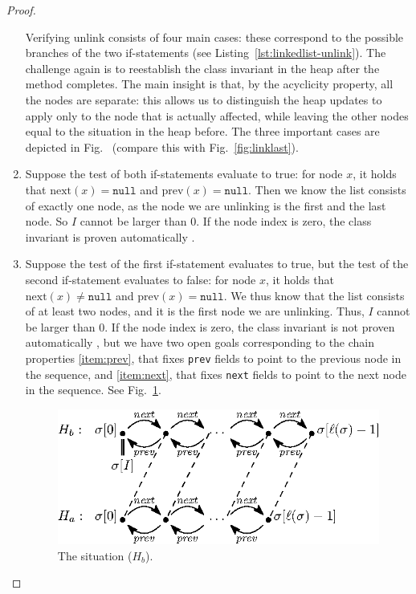 \documentclass[runningheads]{llncs}
\begin{document}
\begin{proof}
\begin{enumerate}
    Verifying unlink consists of four main cases: these correspond to the possible branches of the two if-statements (see Listing~\ref{lst:linkedlist-unlink}). The challenge again is to reestablish the class invariant in the heap after the method completes. The main insight is that, by the acyclicity property, all the nodes are separate: this allows us to distinguish the heap updates to apply only to the node that is actually affected, while leaving the other nodes equal to the situation in the heap before. The three important cases are depicted in Fig.~ (compare this with Fig.~\ref{fig:linklast}).

    \item Suppose the test of both if-statements evaluate to true: for node $x$, it holds that $\mathrm{next}(x)=\mathtt{null}$ and $\mathrm{prev}(x)=\mathtt{null}$. Then we know the list consists of exactly one node, as the node we are unlinking is the first and the last node. So $I$ cannot be larger than 0. If the node index is zero, the class invariant is proven automatically .
    
    \item Suppose the test of the first if-statement evaluates to true, but the test of the second if-statement evaluates to false: for node $x$, it holds that $\mathrm{next}(x)\neq\mathtt{null}$ and $\mathrm{prev}(x)=\mathtt{null}$. We thus know that the list consists of at least two nodes, and it is the first node we are unlinking. Thus, $I$ cannot be larger than 0. If the node index is zero, the class invariant is not proven automatically , but we have two open goals corresponding to the chain properties \ref{item:prev}, that fixes \texttt{prev} fields to point to the previous node in the sequence, and \ref{item:next}, that fixes \texttt{next} fields to point to the next node in the sequence. See Fig.~\ref{fig:unlink-first}.

\begin{figure}
   \centering
   \includegraphics[scale=0.425]{figures/linkedlist-unlink-first.eps}
   \caption{The situation ($H_b$).}
   \vspace*{-12pt}
   \label{fig:unlink-first}
\end{figure}


\end{enumerate}
\end{proof}
\end{document}

